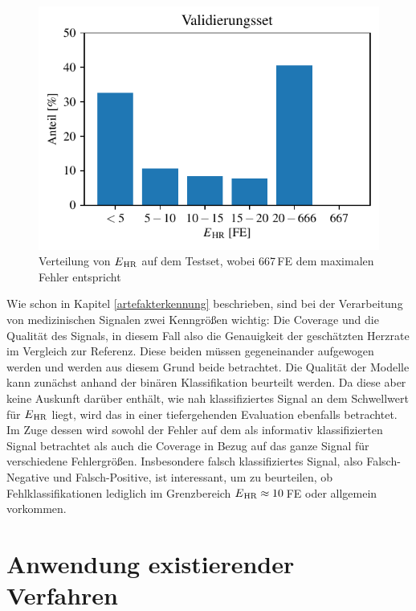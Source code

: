 \begin{figure}[h]
	\centering
	\includegraphics{pic/mlp-statistical-testset.pdf}
	\caption[Verteilung von $E\textsubscript{HR}$ auf dem Testset]{Verteilung von $E\textsubscript{HR}$ auf dem Testset, wobei 667\,\si{FE} dem maximalen Fehler entspricht}
	\label{fig:validation-set}
\end{figure}


Wie schon in Kapitel \ref{artefakterkennung} beschrieben, sind bei der Verarbeitung von medizinischen Signalen zwei Kenngrößen wichtig: Die Coverage und die Qualität des Signals, in diesem Fall also die Genauigkeit der geschätzten Herzrate im Vergleich zur Referenz. Diese beiden müssen gegeneinander aufgewogen werden und werden aus diesem Grund beide betrachtet. Die Qualität der Modelle kann zunächst anhand der binären Klassifikation beurteilt werden. Da diese aber keine Auskunft darüber enthält, wie nah klassifiziertes Signal an dem Schwellwert für $E\textsubscript{HR}$ liegt, wird das in einer tiefergehenden Evaluation ebenfalls betrachtet. Im Zuge dessen wird sowohl der Fehler auf dem als informativ klassifizierten Signal betrachtet als auch die Coverage in Bezug auf das ganze Signal für verschiedene Fehlergrößen. Insbesondere falsch klassifiziertes Signal, also Falsch-Negative und Falsch-Positive, ist interessant, um zu beurteilen, ob Fehlklassifikationen lediglich im Grenzbereich $E\textsubscript{HR} \approx 10$\,\si{FE} oder allgemein vorkommen.

\section{Anwendung existierender Verfahren}

